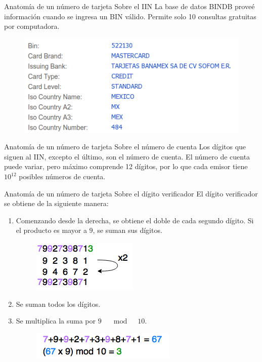 \begin{frame}{Anatomía de un número de tarjeta}
  {Sobre el IIN}
  La base de datos BINDB proveé información cuando se ingresa un BIN válido.
  Permite solo 10 consultas gratuitas por computadora.
  \begin{figure}[H]
    \begin{center}
      \includegraphics[width=0.75\linewidth]{diagramas/bindb.png}
    \end{center}
  \end{figure}
\end{frame}

\begin{frame}{Anatomía de un número de tarjeta}
  {Sobre el número de cuenta}
  Los dígitos que siguen al IIN, excepto el último, son el número de cuenta.
  El número de cuenta puede variar, pero máximo comprende 12 dígitos, por lo que
  cada emisor tiene $10^{12}$ posibles números de cuenta.
\end{frame}

\begin{frame}{Anatomía de un número de tarjeta}
  {Sobre el dígito verificador}
  El dígito verificador se obtiene de la siguiente manera:
  \begin{enumerate}
    \item Comenzando desde la derecha, se obtiene el doble de cada segundo
      dígito. Si el producto es mayor a $9$, se suman sus dígitos.
      \begin{figure}[H]
        \begin{center}
          \includegraphics[width=0.4\linewidth]{diagramas/luhn_1.png}
        \end{center}
      \end{figure}
    \item Se suman todos los dígitos.
    \item Se multiplica la suma por $9 \quad \mod \quad 10$.
      \begin{figure}[H]
        \begin{center}
          \includegraphics[width=0.5\linewidth]{diagramas/luhn_2.png}
        \end{center}
      \end{figure}
  \end{enumerate}
\end{frame}
